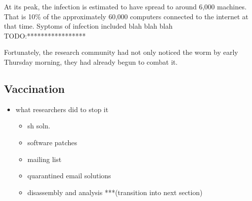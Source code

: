 At its peak, the infection is estimated to have spread to around 6,000 machines.
That is 10\% of the approximately 60,000 computers connected to the internet at
that time\cite{eichin_microscope_1989}\cite{marsan_morris_2008}. Syptoms of
infection included blah blah blah TODO:*****************

Fortunately, the research community had not only noticed the worm by early
Thursday morning, they had already begun to combat it.


\subsection*{Vaccination}
\begin{itemize}
    \item what researchers did to stop it
    	\begin{itemize}
    	\item sh soln.
        \item software patches
        \item mailing list
        \item quarantined email solutions
        \item disassembly and analysis ***(transition into next section)
    	\end{itemize}
\end{itemize}

